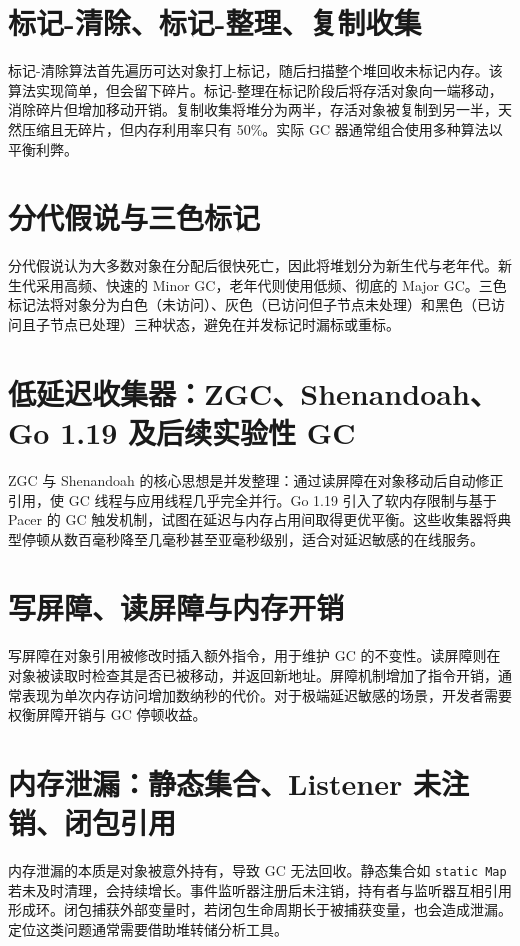 \chapter{标记-清除、标记-整理、复制收集}
标记-清除算法首先遍历可达对象打上标记，随后扫描整个堆回收未标记内存。该算法实现简单，但会留下碎片。标记-整理在标记阶段后将存活对象向一端移动，消除碎片但增加移动开销。复制收集将堆分为两半，存活对象被复制到另一半，天然压缩且无碎片，但内存利用率只有 50\%{}。实际 GC 器通常组合使用多种算法以平衡利弊。\par
\chapter{分代假说与三色标记}
分代假说认为大多数对象在分配后很快死亡，因此将堆划分为新生代与老年代。新生代采用高频、快速的 Minor GC，老年代则使用低频、彻底的 Major GC。三色标记法将对象分为白色（未访问）、灰色（已访问但子节点未处理）和黑色（已访问且子节点已处理）三种状态，避免在并发标记时漏标或重标。\par
\chapter{低延迟收集器：ZGC、Shenandoah、Go 1.19 及后续实验性 GC}
ZGC 与 Shenandoah 的核心思想是并发整理：通过读屏障在对象移动后自动修正引用，使 GC 线程与应用线程几乎完全并行。Go 1.19 引入了软内存限制与基于 Pacer 的 GC 触发机制，试图在延迟与内存占用间取得更优平衡。这些收集器将典型停顿从数百毫秒降至几毫秒甚至亚毫秒级别，适合对延迟敏感的在线服务。\par
\chapter{写屏障、读屏障与内存开销}
写屏障在对象引用被修改时插入额外指令，用于维护 GC 的不变性。读屏障则在对象被读取时检查其是否已被移动，并返回新地址。屏障机制增加了指令开销，通常表现为单次内存访问增加数纳秒的代价。对于极端延迟敏感的场景，开发者需要权衡屏障开销与 GC 停顿收益。\par
\chapter{内存泄漏：静态集合、Listener 未注销、闭包引用}
内存泄漏的本质是对象被意外持有，导致 GC 无法回收。静态集合如 \texttt{static Map} 若未及时清理，会持续增长。事件监听器注册后未注销，持有者与监听器互相引用形成环。闭包捕获外部变量时，若闭包生命周期长于被捕获变量，也会造成泄漏。定位这类问题通常需要借助堆转储分析工具。\par
